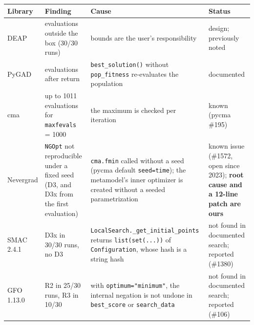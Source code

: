 \documentclass[acmsmall,screen,review,anonymous=false]{acmart}
\newcounter{none}
\begin{document}
{\def\LTcaptype{none} %
\begin{longtable}[]{@{}
  >{\raggedright\arraybackslash}p{}
  >{\raggedright\arraybackslash}p{}
  >{\raggedright\arraybackslash}p{}
  >{\raggedright\arraybackslash}p{}@{}}
\toprule\noalign{}
\begin{minipage}[b]{\linewidth}\raggedright
Library
\end{minipage} & \begin{minipage}[b]{\linewidth}\raggedright
Finding
\end{minipage} & \begin{minipage}[b]{\linewidth}\raggedright
Cause
\end{minipage} & \begin{minipage}[b]{\linewidth}\raggedright
Status
\end{minipage} \\
\midrule\noalign{}
\endhead
\bottomrule\noalign{}
\endlastfoot
DEAP & evaluations outside the box (30/30 runs) & bounds are the user's responsibility & design; previously noted \citep{Ravber_2025} \\
PyGAD & 21 evaluations after return & \texttt{best\_\allowbreak{}solution()} without \texttt{pop\_\allowbreak{}fitness} re-evaluates the population & documented \\
cma & up to 1011 evaluations for \texttt{maxfevals} = 1000 & the maximum is checked per iteration & known (pycma \#195) \\
Nevergrad & \texttt{NGOpt} not reproducible under a fixed seed (D3, and D3x from the first evaluation) & \texttt{cma.\allowbreak{}fmin} called without a seed (pycma default \texttt{seed=\textquotesingle{}time\textquotesingle{}}); the metamodel's inner optimizer is created without a seeded parametrization & known issue (\#1572, open since 2023); \textbf{root cause and a 12-line patch are ours} \\
SMAC 2.4.1 & D3x in 30/30 runs, no D3 & \texttt{LocalSearch.\allowbreak{}\_\allowbreak{}get\_\allowbreak{}initial\_\allowbreak{}points} returns \texttt{list(set(.\allowbreak{}.\allowbreak{}.\allowbreak{}))} of \texttt{Configuration}, whose hash is a string hash & not found in documented search; reported (\#1380) \\
GFO 1.13.0 & R2 in 25/30 runs, R3 in 10/30 & with \texttt{optimum="minimum"}, the internal negation is not undone in \texttt{best\_\allowbreak{}score} or \texttt{search\_\allowbreak{}data} & not found in documented search; reported (\#106) \\

\end{longtable}}
\end{document}
